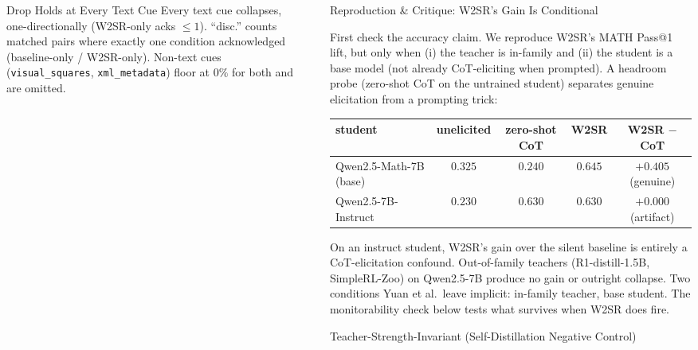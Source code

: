 \documentclass[final]{beamer}
\newlength{\sepwidth}
\newlength{\colwidth}
\newcommand{\separatorcolumn}{\begin{column}{\sepwidth}\end{column}}
\begin{document}
\begin{frame}[t]
\begin{columns}[t]
\begin{column}{\colwidth}
\begin{block}{Drop Holds at Every Text Cue}
    Every text cue collapses, one-directionally (W2SR-only acks $\le 1$). ``disc.'' counts matched pairs where exactly one condition acknowledged (baseline-only / W2SR-only). Non-text cues (\texttt{visual\_squares}, \texttt{xml\_metadata}) floor at $0\%$ for both and are omitted.

  \end{block}

\end{column}

\separatorcolumn

\begin{column}{\colwidth}

  \begin{block}{Reproduction \& Critique: W2SR's Gain Is Conditional}

    First check the accuracy claim. We reproduce W2SR's MATH Pass@1 lift, but only when (i) the teacher is in-family and (ii) the student is a base model (not already CoT-eliciting when prompted). A headroom probe (zero-shot CoT on the untrained student) separates genuine elicitation from a prompting trick:

    \begin{center}
      \renewcommand{\arraystretch}{1.2}
      \small
      \begin{tabular}{lcccc}
        \toprule
        student & unelicited & zero-shot CoT & W2SR & W2SR $-$ CoT \\
        \midrule
        Qwen2.5-Math-7B (base) & $0.325$ & $0.240$ & $0.645$ & $+0.405$ (genuine) \\
        Qwen2.5-7B-Instruct    & $0.230$ & $0.630$ & $0.630$ & $+0.000$ (artifact) \\
        \bottomrule
      \end{tabular}
    \end{center}

    On an instruct student, W2SR's gain over the silent baseline is entirely a CoT-elicitation confound. Out-of-family teachers (R1-distill-1.5B, SimpleRL-Zoo) on Qwen2.5-7B produce no gain or outright collapse. Two conditions Yuan et al.\ leave implicit: in-family teacher, base student. The monitorability check below tests what survives when W2SR does fire.

  \end{block}

  \begin{block}{Teacher-Strength-Invariant (Self-Distillation Negative Control)}


\end{block}
\end{column}
\end{columns}
\end{frame}
\end{document}
